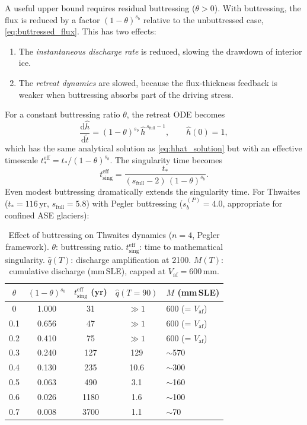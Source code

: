 \documentclass[11pt]{article}
\newcommand{\dd}{\mathrm{d}}
\newcommand{\hhat}{\hat{h}}
\newcommand{\Vaf}{V_{\mathrm{af}}}
\newcommand{\tdim}{\tilde{t}}
\begin{document}
A useful upper bound requires residual buttressing ($\theta > 0$). With buttressing, the flux is reduced by a factor $(1 - \theta)^{s_b}$ relative to the unbuttressed case, \eqref{eq:buttressed_flux}. This has two effects:
\begin{enumerate}
	\item The \emph{instantaneous discharge rate} is reduced, slowing the drawdown of interior ice.
	\item The \emph{retreat dynamics} are slowed, because the flux-thickness feedback is weaker when buttressing absorbs part of the driving stress.
\end{enumerate}

For a constant buttressing ratio $\theta$, the retreat ODE becomes
\begin{equation}
	\frac{\dd\hhat}{\dd\tdim} = (1-\theta)^{s_b}\,\hhat^{\,s_{\mathrm{full}}-1},
	\qquad \hhat(0) = 1,
	\label{eq:hhat_buttressed}
\end{equation}
which has the same analytical solution as \eqref{eq:hhat_solution} but with an effective timescale $t_*^{\mathrm{eff}} = t_*/(1-\theta)^{s_b}$. The singularity time becomes
\begin{equation}
	t_{\mathrm{sing}}^{\mathrm{eff}} = \frac{t_*}{(s_{\mathrm{full}} - 2)\,(1-\theta)^{s_b}}.
	\label{eq:tsing_buttressed}
\end{equation}
Even modest buttressing dramatically extends the singularity time. For Thwaites ($t_* = 116$\,yr, $s_{\mathrm{full}} = 5.8$) with Pegler buttressing ($s_b^{(P)} = 4.0$, appropriate for confined ASE glaciers):

\begin{table}[ht]
\centering
\caption{Effect of buttressing on Thwaites dynamics ($n = 4$, Pegler framework). $\theta$: buttressing ratio. $t_{\mathrm{sing}}^{\mathrm{eff}}$: time to mathematical singularity. $\hat{q}(T)$: discharge amplification at 2100. $M(T)$: cumulative discharge (mm\,SLE), capped at $\Vaf = 600$\,mm.}
\label{tab:buttressing}
\smallskip
\begin{tabular}{c c c c l}
\toprule
$\theta$ & $(1-\theta)^{s_b}$ & $t_{\mathrm{sing}}^{\mathrm{eff}}$ (yr) & $\hat{q}(T=90)$ & $M$ (mm\,SLE) \\
\midrule
0    & 1.000 & 31   & $\gg 1$ & 600 (= $\Vaf$) \\
0.1  & 0.656 & 47   & $\gg 1$ & 600 (= $\Vaf$) \\
0.2  & 0.410 & 75   & $\gg 1$ & 600 (= $\Vaf$) \\
0.3  & 0.240 & 127  & 129 & $\sim$570 \\
0.4  & 0.130 & 235  & 10.6 & $\sim$300 \\
0.5  & 0.063 & 490  & 3.1 & $\sim$160 \\
0.6  & 0.026 & 1180 & 1.6 & $\sim$100 \\
0.7  & 0.008 & 3700 & 1.1 & $\sim$70 \\
\bottomrule
\end{tabular}
\end{table}
\end{document}
